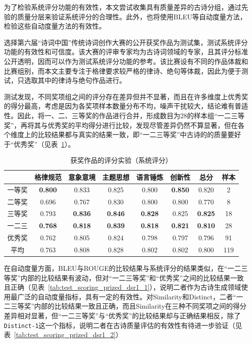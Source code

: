 为了检验系统评分功能的有效性，本文尝试收集具有质量差异的古诗分组，通过先验的质量分层来验证系统评分的合理性。此外，也将使用BLEU等自动度量方法，检验这些自动度量方法的有效性。

选择第六届“诗词中国”传统诗词创作大赛的公开获奖作品为测试集，测试系统评分功能的有效性和可信度。该大赛的评审专家均为古诗词领域的专家，且其评分标准公开透明，因而可以作为测试系统评分功能的参考。该比赛设有不同的作品体裁和比赛组别，而本文主要专注于格律要求较严格的律诗、绝句等体裁，因此为便于测试，只选取其中的律诗与绝句作品进行。

测试发现，不同奖项组之间的评分存在差异但并不显著，而且在许多维度上优秀奖的得分最高，考虑是因为各奖项样本数量分布不均，噪声干扰较大，结论难有普适性。因此，将一、二、三等奖的作品进行合并，形成数目为28的样本组“一二三等奖”，再将其与优秀奖的平均得分进行比较，发现尽管差异仍然不算显著，但在各个维度上的比较结果都与真实的结果一致，即“一二三等奖”中古诗的的质量要好于“优秀奖”（见表~\ref{tab:test_scoring_prized_dsr1_detail}）。

\begin{table}[ht]
  \centering
  \caption{获奖作品的评分实验（系统评分）}
  \label{tab:test_scoring_prized_dsr1_detail}
  \begin{tabular}{cccccccc}
      \toprule
      &格律规范& 意象意境& 主题思想& 语言锤炼&创新性& 总分&样本\\
      \midrule
      一等奖	&	\textbf{0.800} &	0.833 &	0.825 &	0.800 &	\textbf{0.850} &	0.820 &	2	\\
      二等奖	&	0.696 	&	0.767 	&	0.830 	&	0.800 	&	0.800 	&	0.770 	&	8	\\
      三等奖	&	0.793 	&	\textbf{0.836} 	&	\textbf{0.846} 	&	\textbf{0.828} 	&	0.825 	&	\textbf{0.825} 	&	18	\\
      \cmidrule{2-7} %
      一二三	&	\textbf{0.768} 	&	\textbf{0.818} 	&	\textbf{0.839} 	&	\textbf{0.818} 	&	\textbf{0.821} 	&	\textbf{0.810} 	&	28	\\
      优秀奖	&	0.762 	&	0.805 	&	0.824 	&	0.798 	&	0.797 	&	0.796 	&	91	\\
      \cmidrule{2-7} %
      平均	&	0.763 	&	0.808 	&	0.828 	&	0.802 	&	0.802 	&	0.800 	&	119	\\
      \bottomrule
  \end{tabular}
\end{table}

在自动度量方面，BLEU与ROUGE的比较结果与系统评分的结果类似，在“一二三等奖”内部的比较结果有波动，但对“一二三等奖”和“优秀奖”之间的比较结果一致且正确（见表~\ref{tab:test_scoring_prized_dsr1_1}），说明二者作为古诗生成领域使用最广泛的自动度量指标，具有一定的有效性。对Similarity和Distinct，二者“一二三等奖”内部的比较结果一致且正确，而且Similarity在三种不同奖项之间的得分差异相对显著，但“一二三等奖”与“优秀奖”的比较结果却与正确结果相反，除了\verb|Distinct-1|这一个指标，说明二者在古诗质量评估的有效性有待进一步验证（见表~\ref{tab:test_scoring_prized_dsr1_2}）

